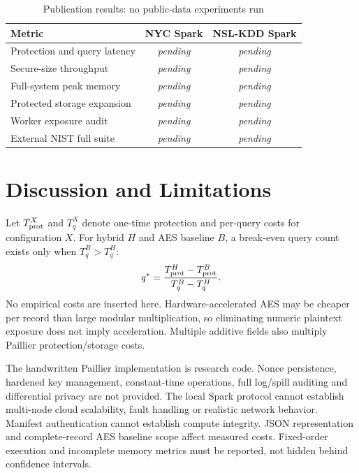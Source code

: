\documentclass[conference]{IEEEtran}
\newcommand{\pending}{\textit{pending}}
\begin{document}
\begin{table}[t]
\centering\caption{Publication results: no public-data experiments run}
\begin{tabular}{lcc}\toprule
Metric & NYC Spark & NSL-KDD Spark\\\midrule
Protection and query latency & \pending & \pending\\
Secure-size throughput & \pending & \pending\\
Full-system peak memory & \pending & \pending\\
Protected storage expansion & \pending & \pending\\
Worker exposure audit & \pending & \pending\\
External NIST full suite & \pending & \pending\\\bottomrule
\end{tabular}
\end{table}

\section{Discussion and Limitations}
Let $T_{\rm prot}^X$ and $T_q^X$ denote one-time protection and per-query costs for configuration $X$. For hybrid $H$ and AES baseline $B$, a break-even query count exists only when $T_q^B>T_q^H$:
\begin{equation}
q^*=\frac{T_{\rm prot}^H-T_{\rm prot}^B}{T_q^B-T_q^H}.
\end{equation}
No empirical costs are inserted here. Hardware-accelerated AES may be cheaper per record than large modular multiplication, so eliminating numeric plaintext exposure does not imply acceleration. Multiple additive fields also multiply Paillier protection/storage costs.

The handwritten Paillier implementation is research code. Nonce persistence, hardened key management, constant-time operations, full log/spill auditing and differential privacy are not provided. The local Spark protocol cannot establish multi-node cloud scalability, fault handling or realistic network behavior. Manifest authentication cannot establish compute integrity. JSON representation and complete-record AES baseline scope affect measured costs. Fixed-order execution and incomplete memory metrics must be reported, not hidden behind confidence intervals.
\end{document}
